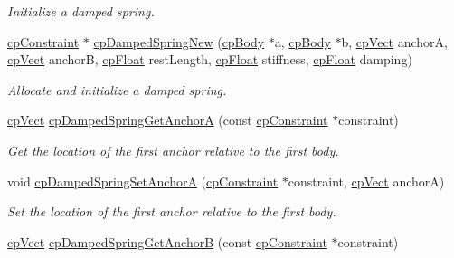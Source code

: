 \begin{DoxyCompactItemize}
\begin{DoxyCompactList}\small\item\em Initialize a damped spring. \end{DoxyCompactList}\item 
\hypertarget{group__cp_damped_spring_gabbf00ac13620488c34deb047a6a1298d}{}\hyperlink{structcp_constraint}{cp\+Constraint} $\ast$ \hyperlink{group__cp_damped_spring_gabbf00ac13620488c34deb047a6a1298d}{cp\+Damped\+Spring\+New} (\hyperlink{structcp_body}{cp\+Body} $\ast$a, \hyperlink{structcp_body}{cp\+Body} $\ast$b, \hyperlink{structcp_vect}{cp\+Vect} anchor\+A, \hyperlink{structcp_vect}{cp\+Vect} anchor\+B, \hyperlink{group__basic_types_gac1ed65573e035bf892505768c852d8d3}{cp\+Float} rest\+Length, \hyperlink{group__basic_types_gac1ed65573e035bf892505768c852d8d3}{cp\+Float} stiffness, \hyperlink{group__basic_types_gac1ed65573e035bf892505768c852d8d3}{cp\+Float} damping)\label{group__cp_damped_spring_gabbf00ac13620488c34deb047a6a1298d}

\begin{DoxyCompactList}\small\item\em Allocate and initialize a damped spring. \end{DoxyCompactList}\item 
\hypertarget{group__cp_damped_spring_gaa7a315b9b166669cc978d3e9c9ff44a1}{}\hyperlink{structcp_vect}{cp\+Vect} \hyperlink{group__cp_damped_spring_gaa7a315b9b166669cc978d3e9c9ff44a1}{cp\+Damped\+Spring\+Get\+Anchor\+A} (const \hyperlink{structcp_constraint}{cp\+Constraint} $\ast$constraint)\label{group__cp_damped_spring_gaa7a315b9b166669cc978d3e9c9ff44a1}

\begin{DoxyCompactList}\small\item\em Get the location of the first anchor relative to the first body. \end{DoxyCompactList}\item 
\hypertarget{group__cp_damped_spring_ga547b53f350d771a156814241052dc04a}{}void \hyperlink{group__cp_damped_spring_ga547b53f350d771a156814241052dc04a}{cp\+Damped\+Spring\+Set\+Anchor\+A} (\hyperlink{structcp_constraint}{cp\+Constraint} $\ast$constraint, \hyperlink{structcp_vect}{cp\+Vect} anchor\+A)\label{group__cp_damped_spring_ga547b53f350d771a156814241052dc04a}

\begin{DoxyCompactList}\small\item\em Set the location of the first anchor relative to the first body. \end{DoxyCompactList}\item 
\hypertarget{group__cp_damped_spring_gae27ac9f281f2d53a2b5f5f2c759281b9}{}\hyperlink{structcp_vect}{cp\+Vect} \hyperlink{group__cp_damped_spring_gae27ac9f281f2d53a2b5f5f2c759281b9}{cp\+Damped\+Spring\+Get\+Anchor\+B} (const \hyperlink{structcp_constraint}{cp\+Constraint} $\ast$constraint)\label{group__cp_damped_spring_gae27ac9f281f2d53a2b5f5f2c759281b9}


\end{DoxyCompactItemize}
